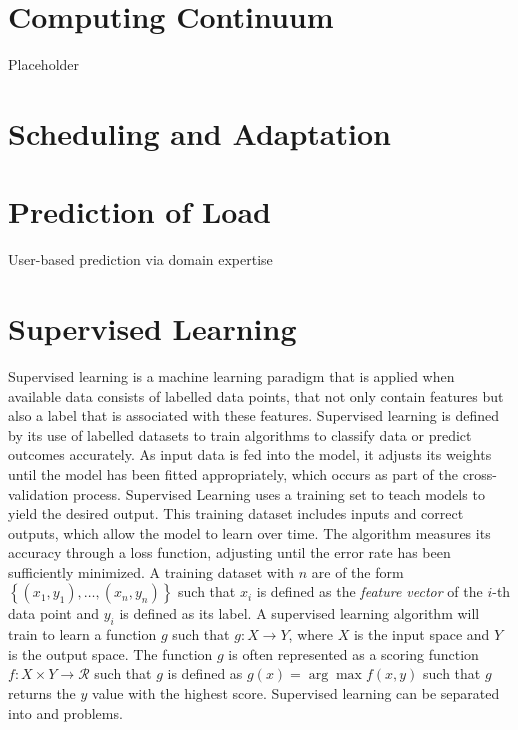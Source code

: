 



    \section{Computing Continuum}
    \label{sec:computing-continuum-background}

        Placeholder


    \section{Scheduling and Adaptation}
    \label{sec:scheduling-and-adaptation-background}

    \section{Prediction of Load}
    \label{sec:prediction-of-load-background}

        User-based prediction via domain expertise

    \section{Supervised Learning}
    \label{sec:supervised-learning}

        Supervised learning is a machine learning paradigm that is applied when available data consists of labelled data points, that not only contain features but also a label that is associated with these features.
        Supervised learning is defined by its use of labelled datasets to train algorithms to classify data or predict outcomes accurately.
        As input data is fed into the model, it adjusts its weights until the model has been fitted appropriately, which occurs as part of the cross-validation process.
        Supervised Learning uses a training set to teach models to yield the desired output.  
        This training dataset includes inputs and correct outputs, which allow the model to learn over time. The algorithm measures its accuracy through a loss function, adjusting until the error rate has been sufficiently minimized.
        A training dataset with $n$ are of the form $\left\{(x_1, y_1), \dots , (x_n, y_n)\right\}$ such that $x_i$ is defined as the \emph{feature vector} of the $i$-th data point and $y_i$ is defined as its label.
        A supervised learning algorithm will train to learn a function $g$ such that $g: X \rightarrow Y$, where $X$ is the input space and $Y$ is the output space.
        The function $g$ is often represented as a scoring function $f: X \times Y \rightarrow \mathcal{R}$ such that $g$ is defined as $g(x) = \arg \max f(x, y)$ such that $g$ returns the $y$ value with the highest score.
        Supervised learning can be separated into  and  problems.

